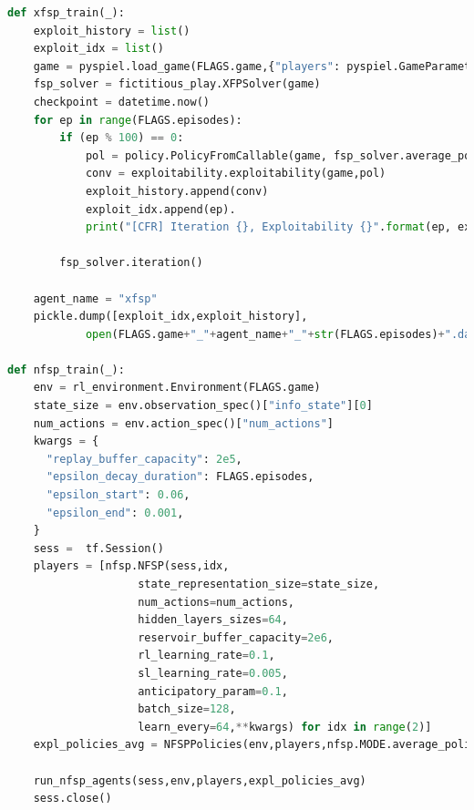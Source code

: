 \documentclass[10pt,a4paper]{article}
\begin{document}
\begin{lstlisting}[language=Python]
def xfsp_train(_):
    exploit_history = list()
    exploit_idx = list()
    game = pyspiel.load_game(FLAGS.game,{"players": pyspiel.GameParameter(2)})
    fsp_solver = fictitious_play.XFPSolver(game)
    checkpoint = datetime.now()
    for ep in range(FLAGS.episodes):
        if (ep % 100) == 0:
            pol = policy.PolicyFromCallable(game, fsp_solver.average_policy_callable())
            conv = exploitability.exploitability(game,pol)
            exploit_history.append(conv)
            exploit_idx.append(ep).
            print("[CFR] Iteration {}, Exploitability {}".format(ep, expl))

        fsp_solver.iteration()

    agent_name = "xfsp"
    pickle.dump([exploit_idx,exploit_history],
    		open(FLAGS.game+"_"+agent_name+"_"+str(FLAGS.episodes)+".dat","wb"))

def nfsp_train(_):
    env = rl_environment.Environment(FLAGS.game)
    state_size = env.observation_spec()["info_state"][0]
    num_actions = env.action_spec()["num_actions"]
    kwargs = {
      "replay_buffer_capacity": 2e5,
      "epsilon_decay_duration": FLAGS.episodes,
      "epsilon_start": 0.06,
      "epsilon_end": 0.001,
    }
    sess =  tf.Session()
    players = [nfsp.NFSP(sess,idx,
                    state_representation_size=state_size,
                    num_actions=num_actions,
                    hidden_layers_sizes=64,
                    reservoir_buffer_capacity=2e6,
                    rl_learning_rate=0.1,
                    sl_learning_rate=0.005,
                    anticipatory_param=0.1,
                    batch_size=128,
                    learn_every=64,**kwargs) for idx in range(2)]  
    expl_policies_avg = NFSPPolicies(env,players,nfsp.MODE.average_policy)
    
    run_nfsp_agents(sess,env,players,expl_policies_avg)
    sess.close()
\end{lstlisting}
\newpage
\end{document}
